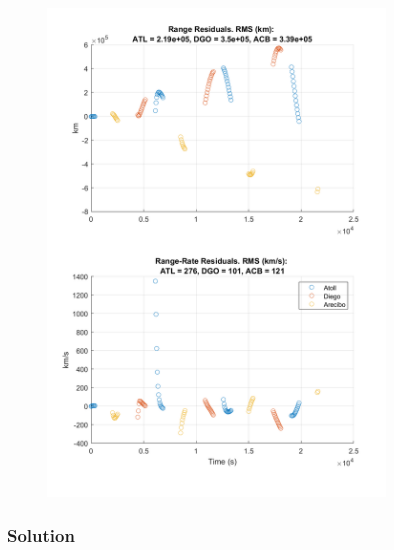\documentclass[conf]{new-aiaa}
\begin{document}
\begin{center}
	 \\
\end{center}

\begin{figure}
\centering 
\includegraphics[width=0.8\textwidth]{range_rate_res.png}
\end{figure}

\subsubsection*{Solution} 
\end{document}
